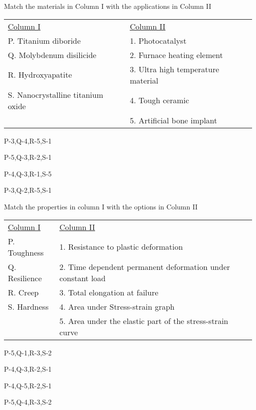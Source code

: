 \item %
Match the materials in Column I with the applications in Column II 
\begin{tabular}{l l}
\underline{Column I} & \underline{Column II} \\
P. Titanium diboride & 1. Photocatalyst \\
Q. Molybdenum disilicide & 2. Furnace heating element \\
R. Hydroxyapatite & 3. Ultra high temperature material \\
S. Nanocrystalline titanium oxide & 4. Tough ceramic \\
 & 5. Artificial bone implant \\
 \end{tabular}
\begin{enumerate}
\begin{multicols}{2}
\item P-3,Q-4,R-5,S-1
\item P-5,Q-3,R-2,S-1
\item P-4,Q-3,R-1,S-5
\item P-3,Q-2,R-5,S-1
\end{multicols}
\end{enumerate}
\item %
Match the properties in column I with the options in Column II \\
\begin{tabular}{l l}
\underline{Column I} & \underline{Column II} \\
P. Toughness & 1. Resistance to plastic deformation \\
Q. Resilience & 2. Time dependent permanent deformation under constant load \\
R. Creep & 3. Total elongation at failure \\
S. Hardness & 4. Area under Stress-strain graph \\
 & 5. Area under the elastic part of the stress-strain curve \\
 \end{tabular}
 \begin{enumerate}
\begin{multicols}{2}
\item P-5,Q-1,R-3,S-2
\item P-4,Q-3,R-2,S-1
\item P-4,Q-5,R-2,S-1
\item P-5,Q-4,R-3,S-2
\end{multicols}
\end{enumerate}
\item %
